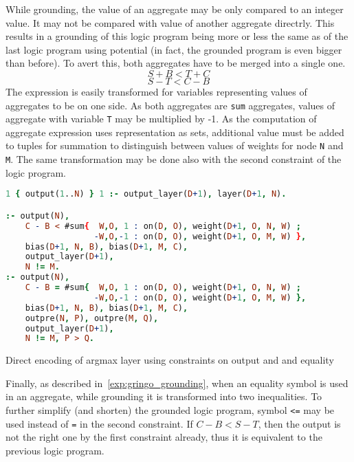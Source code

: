 While grounding, the value of an aggregate may be only compared to an integer value.
It may not be compared with value of another aggregate directrly. This results in
a grounding of this logic program being more or less the same as of the last logic program
using potential (in fact, the grounded program is even bigger than before).
To avert this, both aggregates have to be merged into a single one.
\[S + B < T + C\]
\[S - T < C - B\]
The expression is easily transformed for variables representing values of aggregates to be
on one side. As both aggregates are \texttt{sum} aggregates, values of aggregate with variable
\texttt{T} may be multiplied by -1. As the computation of aggregate expression uses
representation as sets, additional value must be added to tuples for summation to distinguish
between values of weights for node \texttt{N} and \texttt{M}.
The same transformation may be done also with the second constraint of the logic program.

\begin{code}
\begin{lstlisting}[language=Prolog, numbers=none]
1 { output(1..N) } 1 :- output_layer(D+1), layer(D+1, N).

:- output(N),
    C - B < #sum{  W,O, 1 : on(D, O), weight(D+1, O, N, W) ;
                  -W,O,-1 : on(D, O), weight(D+1, O, M, W) },
    bias(D+1, N, B), bias(D+1, M, C),
    output_layer(D+1),
    N != M.
:- output(N),
    C - B = #sum{  W,O, 1 : on(D, O), weight(D+1, O, N, W) ;
                  -W,O,-1 : on(D, O), weight(D+1, O, M, W) },
    bias(D+1, N, B), bias(D+1, M, C),
    outpre(N, P), outpre(M, Q),
    output_layer(D+1),
    N != M, P > Q.
\end{lstlisting}
    \caption{Direct encoding of argmax layer using constraints on output and and equality}\label{enc:argmax_direct_eq}
\end{code}

Finally, as described in~\cref{exp:gringo_grounding}, when an equality symbol is used
in an aggregate, while grounding it is transformed into two inequalities.
To further simplify (and shorten) the grounded logic program, symbol \texttt{<=}
may be used instead of \texttt{=} in the second constraint.
If $C-B < S-T$, then the output is not the right one by the first constraint already,
thus it is equivalent to the previous logic program.

